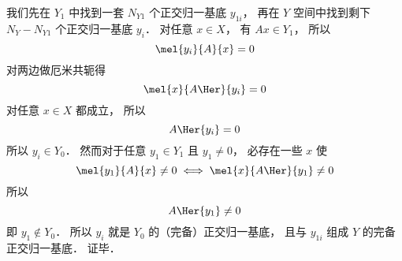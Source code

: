 我们先在 $Y_1$ 中找到一套 $N_{Y1}$ 个正交归一基底 ${y_{1i}}$， 再在 $Y$ 空间中找到剩下 $N_Y - N_{Y1}$ 个正交归一基底 ${y_i}$． 对任意 ${x} \in X$， 有 $A {x} \in Y_1$， 所以
\begin{equation}
\mel{y_i}{A}{x} = 0
\end{equation}
对两边做厄米共轭得%
\begin{equation}
\mel{x}{A\Her}{y_i} = 0
\end{equation}
对任意 ${x}\in X$ 都成立， 所以
\begin{equation}
A\Her{y_i} = 0
\end{equation}
所以 ${y_i} \in Y_0$． 然而对于任意 ${y_1} \in Y_1$ 且 $y_1 \ne 0$， 必存在一些 ${x}$ 使
\begin{equation}
\mel{y_1}{A}{x} \ne 0
\iff
\mel{x}{A\Her}{y_1} \ne 0
\end{equation}
所以
\begin{equation}
A\Her{y_1} \ne 0
\end{equation}
即 ${y_1} \notin Y_0$． 所以 ${y_i}$ 就是 $Y_0$ 的（完备）正交归一基底， 且与 ${y_{1i}}$ 组成 $Y$ 的完备正交归一基底． 证毕．
